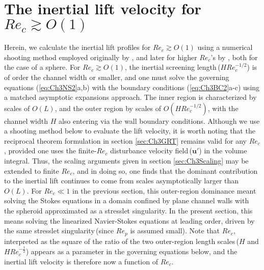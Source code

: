 \documentclass{jfm}
\begin{document}

\section{The inertial lift velocity for $Re_c\gtrsim O(1)$} \label{sec:Ch3Reclarge}

Herein, we calculate the inertial lift profiles for $Re_c \gtrsim O(1)$ using a numerical shooting method employed originally by \cite{schonberghinch1989}, and later for higher $Re_c$'s by \cite{asmolov1999}, both for the case of a sphere. For $Re_c\gtrsim O(1)$, the inertial screening length\,($H Re_c^{-1/2}$) is of order the channel width or smaller, and one must solve the governing equations (\ref{eq:Ch3NS2}a,b) with the boundary conditions (\ref{eq:Ch3BC2}a-c) using a matched asymptotic expansions approach. The inner region is characterized by scales of $O(L)$, and the outer region by scales of $O(HRe_c^{-1/2})$, with the channel width $H$ also entering via the wall boundary conditions. Although we use a shooting method below to evaluate the lift velocity, it is worth noting that the reciprocal theorem formulation in section \ref{sec:Ch3GRT} remains valid for any $Re_c$, provided one uses the finite-$Re_c$ disturbance velocity field\,($\bm{u}'$) in the volume integral. Thus, the scaling arguments given in section \ref{sec:Ch3Scaling} may be extended to finite $Re_c$, and in doing so, one finds that the dominant contribution to the inertial lift continues to come from scales asymptotically larger than $O(L)$. For $Re_c\ll1$ in the previous section, this outer-region dominance meant solving the Stokes equations in a domain confined by plane channel walls with the spheroid approximated as a stresslet singularity. In the present section, this means solving the linearized Navier-Stokes equations at leading order, driven by the same stresslet singularity\,(since $Re_p$ is assumed small). Note that $Re_c$, interpreted as the square of the ratio of the two outer-region length scales\,($H$ and $HRe_c^{-\frac{1}{2}}$) appears as a parameter in the governing equations below, and the inertial lift velocity is therefore now a function of $Re_c$. 
\end{document}
